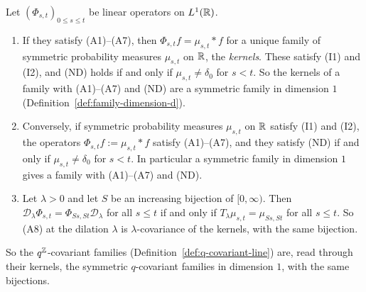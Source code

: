 \begin{lemma}
\label{lem:line-axioms-kernels}

Let $(\Phi_{s,t})_{0 \le s \le t}$ be linear operators on $L^1(\mathbb{R})$.
\begin{enumerate}
\item If they satisfy (A1)--(A7), then $\Phi_{s,t}f = \mu_{s,t} * f$ for a unique family of
symmetric probability measures $\mu_{s,t}$ on $\mathbb{R}$, the \emph{kernels}. These satisfy (I1) and
(I2), and (ND) holds if and only if $\mu_{s,t} \ne \delta_0$ for $s < t$. So the kernels of a
family with (A1)--(A7) and (ND) are a symmetric family in dimension $1$
(Definition~\ref{def:family-dimension-d}).
\item Conversely, if symmetric probability measures $\mu_{s,t}$ on $\mathbb{R}$ satisfy (I1) and (I2),
the operators $\Phi_{s,t}f := \mu_{s,t} * f$ satisfy (A1)--(A7), and they satisfy (ND) if and
only if $\mu_{s,t} \ne \delta_0$ for $s < t$. In particular a symmetric family in dimension $1$
gives a family with (A1)--(A7) and (ND).
\item Let $\lambda > 0$ and let $S$ be an increasing bijection of $[0,\infty)$. Then
$\mathcal{D}_\lambda\Phi_{s,t} = \Phi_{Ss,St}\mathcal{D}_\lambda$ for all $s \le t$ if and only
if $T_\lambda\mu_{s,t} = \mu_{Ss,St}$ for all $s \le t$. So (A8) at the dilation $\lambda$ is
$\lambda$-covariance of the kernels, with the same bijection.
\end{enumerate}
So the $q^{\mathbb{Z}}$-covariant families (Definition~\ref{def:q-covariant-line}) are, read through their
kernels, the symmetric $q$-covariant families in dimension $1$, with the same bijections.
\end{lemma}


